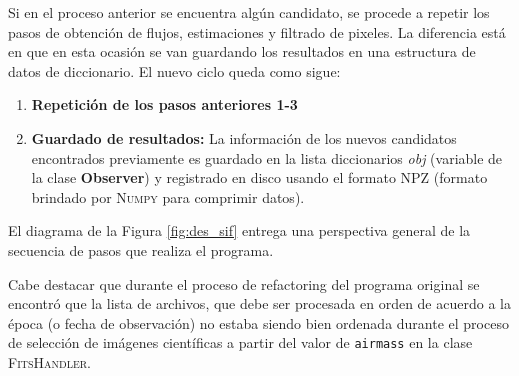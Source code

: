 Si en el proceso anterior se encuentra alg\'un candidato, se procede a repetir los pasos de obtenci\'on de flujos, estimaciones y filtrado de pixeles. La diferencia est\'a en que en esta ocasi\'on se van guardando los resultados en una estructura de datos de diccionario. El nuevo ciclo queda como sigue:

\begin{enumerate}

\item \textbf{Repetici\'on de los pasos anteriores 1-3}
\item \textbf{Guardado de resultados:} La informaci\'on de los nuevos candidatos encontrados previamente es guardado en la lista diccionarios \textit{obj} (variable de la clase \textbf{Observer}) y registrado en disco usando el formato NPZ (formato brindado por \textsc{Numpy} para comprimir datos).
\end{enumerate}


El diagrama de la Figura \ref{fig:des_sif} entrega una perspectiva general de la secuencia de pasos que realiza el programa.
\bigskip

Cabe destacar que durante el proceso de refactoring del programa original se encontr\'o que la lista de archivos, que debe ser procesada en orden de acuerdo a la \'epoca (o fecha de observaci\'on) no estaba siendo bien ordenada durante el proceso de selecci\'on de im\'agenes cient\'ificas a partir del valor de \texttt{airmass} en la clase \textsc{FitsHandler}.
\bigskip


